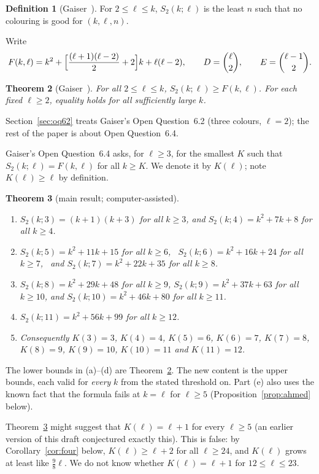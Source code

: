 \documentclass[11pt]{amsart}
\newtheorem{theorem}{Theorem}
\theoremstyle{definition}
\newtheorem{definition}[theorem]{Definition}
\newcommand{\F}{F}
\newcommand{\Stwo}{S_2}
\begin{document}
\begin{definition}[Gaiser~\cite{Gaiser}]
For $2\le\ell\le k$, $\Stwo(k;\ell)$ is the least $n$ such that no colouring is good for $(k,\ell,n)$.
\end{definition}

Write
\[
\F(k,\ell)=k^2+\Bigl[\frac{(\ell+1)(\ell-2)}{2}+2\Bigr]k+\ell(\ell-2),\qquad D=\binom{\ell}{2},\qquad E=\binom{\ell-1}{2}.
\]

\begin{theorem}[Gaiser~{\cite[Thm.~1.1]{Gaiser}}]\label{thm:gaiser}
For all $2\le\ell\le k$, $\Stwo(k;\ell)\ge\F(k,\ell)$. For each fixed $\ell\ge2$, equality holds for all sufficiently large $k$.
\end{theorem}

\noindent Section~\ref{sec:oq62} treats Gaiser's Open Question~6.2 (three colours, $\ell=2$); the rest of the paper is about Open Question~6.4.

\noindent Gaiser's Open Question~6.4 asks, for $\ell\ge3$, for the smallest $K$ such that $\Stwo(k;\ell)=\F(k,\ell)$ for all $k\ge K$. We denote it by $K(\ell)$; note $K(\ell)\ge\ell$ by definition.

\begin{theorem}[main result; computer-assisted]\label{thm:main}
\begin{enumerate}[label=(\alph*)]
\item $\Stwo(k;3)=(k+1)(k+3)$ for all $k\ge3$, and $\Stwo(k;4)=k^2+7k+8$ for all $k\ge4$.
\item $\Stwo(k;5)=k^2+11k+15$ for all $k\ge6$, \ $\Stwo(k;6)=k^2+16k+24$ for all $k\ge7$, \ and $\Stwo(k;7)=k^2+22k+35$ for all $k\ge8$.
\item $\Stwo(k;8)=k^2+29k+48$ for all $k\ge9$, $\Stwo(k;9)=k^2+37k+63$ for all $k\ge10$, and $\Stwo(k;10)=k^2+46k+80$ for all $k\ge11$.
\item $\Stwo(k;11)=k^2+56k+99$ for all $k\ge12$.
\item Consequently $K(3)=3$, $K(4)=4$, $K(5)=6$, $K(6)=7$, $K(7)=8$, $K(8)=9$, $K(9)=10$, $K(10)=11$ and $K(11)=12$.
\end{enumerate}
\end{theorem}

The lower bounds in (a)--(d) are Theorem~\ref{thm:gaiser}. The new content is the upper bounds, each valid for \emph{every} $k$ from the stated threshold on. Part (e) also uses the known fact that the formula fails at $k=\ell$ for $\ell\ge5$ (Proposition~\ref{prop:ahmed} below).

\noindent Theorem~\ref{thm:main} might suggest that $K(\ell)=\ell+1$ for every $\ell\ge5$ (an earlier version of this draft conjectured exactly this). This is false: by Corollary~\ref{cor:four} below, $K(\ell)\ge\ell+2$ for all $\ell\ge24$, and $K(\ell)$ grows at least like $\tfrac98\ell$. We do not know whether $K(\ell)=\ell+1$ for $12\le\ell\le23$.
\end{document}
